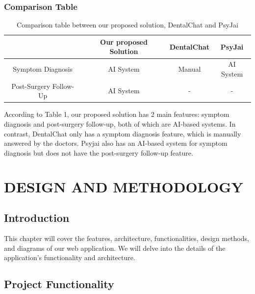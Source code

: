 \documentclass[12pt,oneside,openright,a4paper]{cpe-english-project}
\begin{document}
      \subsection{Comparison Table}
        \begin{table}[h]
          \centering
          \caption{\centering Comparison table between our proposed solution, DentalChat and PsyJai}\label{tab:Comparison_Table}
          \begin{tabular}{|c|c|c|c|} \hline
            & Our proposed Solution & DentalChat & PsyJai \\\hline
            Symptom Diagnosis & AI System & Manual & AI System \\\hline
            Post-Surgery Follow-Up & AI System & - & - \\\hline
          \end{tabular}
        \end{table}
        \qquad According to Table 1, our proposed solution has 2 main features: symptom diagnosis and post-surgery follow-up, both of which are AI-based systems. In contrast, DentalChat only has a symptom diagnosis feature, which is manually answered by the doctors. Psyjai also has an AI-based system for symptom diagnosis but does not have the post-surgery follow-up feature.\par

\chapter{DESIGN AND METHODOLOGY}
  \section{Introduction}
  \qquad This chapter will cover the features, architecture, functionalities, design methods, and diagrams of our web application. We will delve into the details of the application’s functionality and architecture. \par
  \section{Project Functionality}
\end{document}
